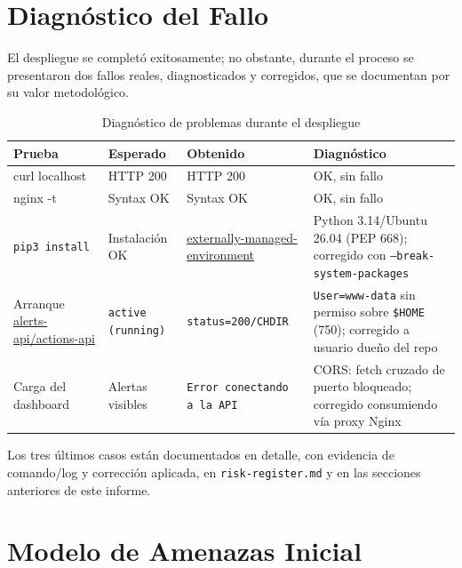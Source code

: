 \documentclass[journal]{IEEEtran}
\begin{document}
\section{Diagnóstico del Fallo}

El despliegue se completó exitosamente; no obstante, durante el proceso se
presentaron dos fallos reales, diagnosticados y corregidos, que se documentan
por su valor metodológico.

\begin{table}[t]
\centering
\caption{Diagnóstico de problemas durante el despliegue}
\label{tab:diagnostico}
\small
\renewcommand{\arraystretch}{1.3}
\begin{tabular}{|>{\raggedright\arraybackslash}p{3.2cm}|>{\raggedright\arraybackslash}p{2.6cm}|>{\raggedright\arraybackslash}p{4.5cm}|>{\raggedright\arraybackslash}p{6.5cm}|}
\hline
\textbf{Prueba} &
\textbf{Esperado} &
\textbf{Obtenido} &
\textbf{Diagnóstico} \\
\hline
curl localhost & HTTP 200 & HTTP 200 & OK, sin fallo \\
\hline
nginx -t & Syntax OK & Syntax OK & OK, sin fallo \\
\hline
\texttt{pip3 install} & Instalación OK & \url{externally-managed-environment} & Python 3.14/Ubuntu 26.04 (PEP 668); corregido con \texttt{--break-system-packages} \\
\hline
Arranque \url{alerts-api/actions-api} & \texttt{active (running)} & \texttt{status=200/CHDIR} & \texttt{User=www-data} sin permiso sobre \texttt{\$HOME} (750); corregido a usuario dueño del repo \\
\hline
Carga del dashboard & Alertas visibles & \texttt{Error conectando a la API} & CORS: fetch cruzado de puerto bloqueado; corregido consumiendo vía proxy Nginx \\
\hline
\end{tabular}
\end{table}

Los tres últimos casos están documentados en detalle, con evidencia de
comando/log y corrección aplicada, en \texttt{risk-register.md} y en las
secciones anteriores de este informe.

\section{Modelo de Amenazas Inicial}
\label{sec:amenazas}
\end{document}
